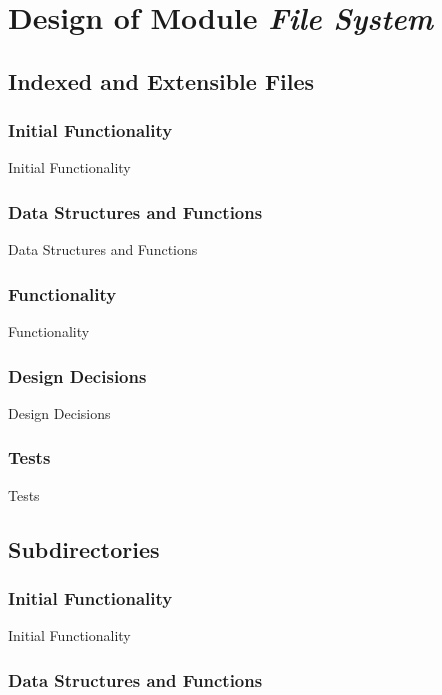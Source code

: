 \chapter{Design of Module \textit{File System}}


\section{Indexed and Extensible Files}
\subsection{Initial Functionality}
  
Initial Functionality

\subsection{Data Structures and Functions}

Data Structures and Functions
  

\subsection{Functionality}

Functionality
  

\subsection{Design Decisions}

Design Decisions
  

\subsection{Tests}

Tests

\section{Subdirectories}
\subsection{Initial Functionality}

Initial Functionality
  

\subsection{Data Structures and Functions}
  

